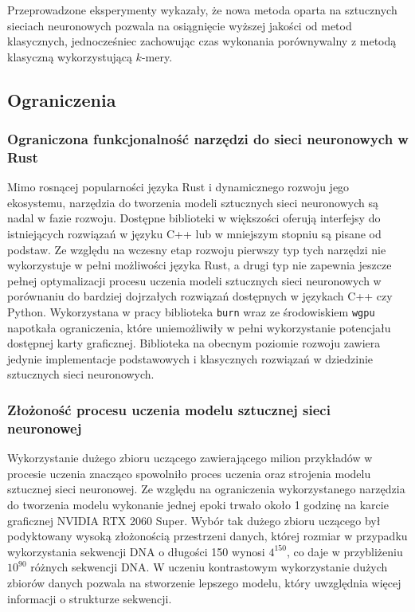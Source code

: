         Przeprowadzone eksperymenty wykazały, że nowa metoda oparta na sztucznych sieciach neuronowych pozwala na osiągnięcie wyższej jakości od metod klasycznych, jednocześniec zachowując czas wykonania porównywalny z metodą klasyczną wykorzystującą $k$-mery.

    \subsection{Ograniczenia}

        \subsubsection{Ograniczona funkcjonalność narzędzi do sieci neuronowych w Rust}

            Mimo rosnącej popularności języka Rust\cite{Rust:popularity} i dynamicznego rozwoju jego ekosystemu, narzędzia do tworzenia modeli sztucznych sieci neuronowych są nadal w fazie rozwoju. Dostępne biblioteki w większości oferują interfejsy do istniejących rozwiązań w języku C++ lub w mniejszym stopniu są pisane od podstaw. Ze względu na wczesny etap rozwoju pierwszy typ tych narzędzi nie wykorzystuje w pełni możliwości języka Rust, a drugi typ nie zapewnia jeszcze pełnej optymalizacji procesu uczenia modeli sztucznych sieci neuronowych w porównaniu do bardziej dojrzałych rozwiązań dostępnych w językach C++ czy Python. Wykorzystana w pracy biblioteka \texttt{burn} wraz ze środowiskiem \texttt{wgpu} napotkała ograniczenia, które uniemożliwiły w pełni wykorzystanie potencjału dostępnej karty graficznej. Biblioteka na obecnym poziomie rozwoju zawiera jedynie implementacje podstawowych i klasycznych rozwiązań w dziedzinie sztucznych sieci neuronowych.

        \subsubsection{Złożoność procesu uczenia modelu sztucznej sieci neuronowej}

            Wykorzystanie dużego zbioru uczącego zawierającego milion przykładów w procesie uczenia znacząco spowolniło proces uczenia oraz strojenia modelu sztucznej sieci neuronowej. Ze względu na ograniczenia wykorzystanego narzędzia do tworzenia modelu wykonanie jednej epoki trwało około 1 godzinę na karcie graficznej NVIDIA RTX 2060 Super. Wybór tak dużego zbioru uczącego był podyktowany wysoką złożonością przestrzeni danych, której rozmiar w przypadku wykorzystania sekwencji DNA o długości 150 wynosi $4^{150}$, co daje w przybliżeniu $10^{90}$ różnych sekwencji DNA. W uczeniu kontrastowym wykorzystanie dużych zbiorów danych pozwala na stworzenie lepszego modelu, który uwzględnia więcej informacji o strukturze sekwencji.

